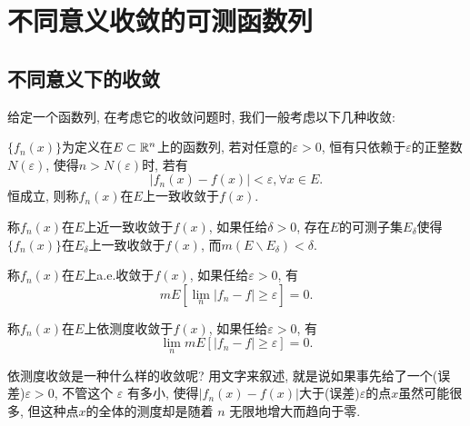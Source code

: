 %
%

\section{不同意义收敛的可测函数列}

\subsection{不同意义下的收敛}

给定一个函数列, 在考虑它的收敛问题时, 我们一般考虑以下几种收敛: 
\begin{definition}[一致收敛]
	$\{ f_n(x) \}$为定义在$E \subset \mathbb{R}^n$上的函数列, 若对任意的$\varepsilon > 0$, 恒有只依赖于$\varepsilon$的正整数$N(\varepsilon)$, 使得$n > N(\varepsilon)$时, 若有
		\begin{equation}
			\left| f_n(x) - f(x) \right| < \varepsilon, \forall x \in E.
		\end{equation}
		恒成立, 则称$f_n(x)$在$E$上一致收敛于$f(x)$. 
\end{definition}

\begin{definition}[近一致收敛]
	称$f_n(x)$在$E$上近一致收敛于$f(x)$, 如果任给$\delta > 0$, 存在$E$的可测子集$E_{\delta}$使得$\{ f_n(x) \}$在$E_{\delta}$上一致收敛于$f(x)$, 而$m (E \backslash E_{\delta} ) < \delta$. 
\end{definition}

\begin{definition}[a.e.收敛]
	称$f_n(x)$在$E$上a.e.收敛于$f(x)$, 如果任给$\varepsilon > 0$, 有
	\begin{equation}
		m E\left[ \lim\limits_n |f_n - f| \geq \varepsilon \right] = 0.
	\end{equation}
\end{definition}

\begin{definition}[依测度收敛]
	称$f_n(x)$在$E$上依测度收敛于$f(x)$, 如果任给$\varepsilon > 0$, 有
	\begin{equation}
		\lim\limits_n m E\left[ |f_n - f| \geq \varepsilon \right] = 0.
	\end{equation}
\end{definition}

依测度收敛是一种什么样的收敛呢? 
用文字来叙述, 
就是说如果事先给了一个(误差)$\varepsilon>0$, 不管这个 $\varepsilon$ 有多小, 
使得$\left|f_{n}(x)-f(x)\right|$大于(误差)$\varepsilon$的点$x$虽然可能很多, 
但这种点$x$的全体的测度却是随着 $n$ 无限地增大而趋向于零.

